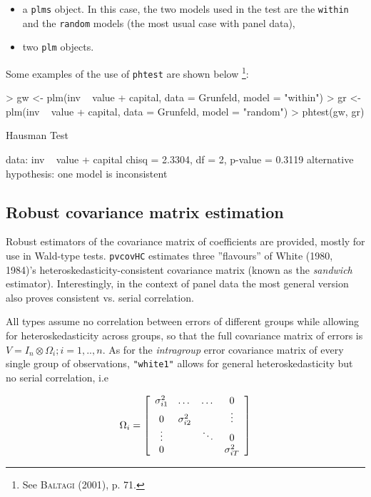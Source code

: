 \documentclass[a4paper]{article}
\begin{document}
\begin{itemize}
\item a \texttt{plms} object. In this case, the two models used in the
  test are the \texttt{within} and the \texttt{random} models (the
  most usual case with panel data),
\item two \texttt{plm} objects.
\end{itemize}


Some examples of the use of \texttt{phtest} are shown below
\footnote{See \textsc{Baltagi} (2001), p. 71.}:


\begin{Schunk}
\begin{Sinput}
> gw <- plm(inv ~ value + capital, data = Grunfeld, model = "within")
> gr <- plm(inv ~ value + capital, data = Grunfeld, model = "random")
> phtest(gw, gr)
\end{Sinput}
\begin{Soutput}
	Hausman Test

data:  inv ~ value + capital 
chisq = 2.3304, df = 2, p-value = 0.3119
alternative hypothesis: one model is inconsistent 
\end{Soutput}
\end{Schunk}


\subsection{Robust covariance matrix estimation}
Robust estimators of the covariance matrix of coefficients are provided, mostly for use in Wald-type tests. \texttt{pvcovHC} estimates three ''flavours'' of White (1980, 1984)'s heteroskedasticity-consistent covariance matrix (known as the \emph{sandwich} estimator). Interestingly, in the context of panel data the most general version also proves consistent vs. serial correlation.

All types assume no correlation between errors of different groups while allowing for heteroskedasticity across groups, so that the full covariance matrix of errors is $  V=I_n \otimes \Omega_i;  i=1,..,n$. As for the \emph{intragroup} error covariance matrix of every single group of observations, \texttt{"white1"} allows for general heteroskedasticity but no serial correlation, i.e

\begin{equation}
 \label{eq:omegaW1}
 \Omega_i=
 \left[ \begin{array}{c c c c}
 \sigma_{i1}^2 & \dots & \dots & 0 \\
 0 & \sigma_{i2}^2 & & \vdots \\
 \vdots & & \ddots & 0 \\
 0 & & & \sigma_{iT}^2 \\
 \end{array} \right]
\end{equation}
\end{document}
